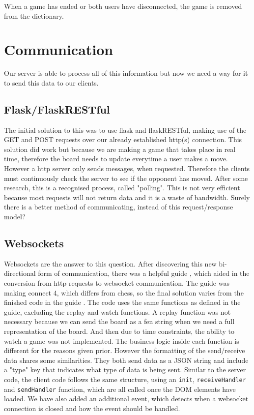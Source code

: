 When a game has ended or both users have disconnected, the game is removed from the dictionary.

\section{Communication}


Our server is able to process all of this information but now we need a way for it to send this data to our clients.

\subsection{Flask/FlaskRESTful}

The initial solution to this was to use flask and flaskRESTful, making use of the GET and POST requests over our already established http(s) connection. This solution did work but because we are making a game that takes place in real time, therefore the board needs to update everytime a user makes a move. However a http server only sends messages, when requested. Therefore the clients must continuously check the server to see if the opponent has moved. After some research, this is a recognised process, called "polling". This is not very efficient because most requests will not return data and it is a waste of bandwidth. Surely there is a better method of communicating, instead of this request/response model?

\subsection{Websockets}

Websockets are the answer to this question. After discovering this new bi-directional form of communication, there was a helpful guide \cite{Websockets}, which aided in the conversion from http requests to websocket communication. The guide was making connect 4, which differs from chess, so the final solution varies from the finished code in the guide \cite{CompleteCode}. The code uses the same functions as defined in the guide, excluding the replay and watch functions. A replay function was not necessary because we can send the board as a fen string when we need a full representation of the board. And then due to time constraints, the ability to watch a game was not implemented. The business logic inside each function is different for the reasons given prior. However the formatting of the send/receive data shares some similarities. They both send data as a JSON string and include a "type" key that indicates what type of data is being sent. Similar to the server code, the client code follows the same structure, using an \lstinline{init}, \lstinline{receiveHandler} and \lstinline{sendHandler} function, which are all called once the DOM elements have loaded. We have also added an additional event, which detects when a websocket connection is closed and how the event should be handled.


